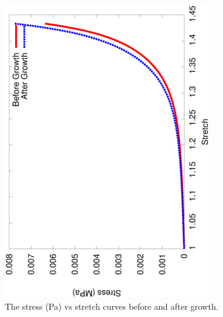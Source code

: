 \begin{figure}[!hpt]
  \centering
  \includegraphics[angle=270,width=0.8\textwidth]{images/examples/lagrangian/swelling/stress-stretch}
  \caption{The stress (Pa) vs stretch curves before and after growth.}
  \label{stress_strain}
\end{figure}

